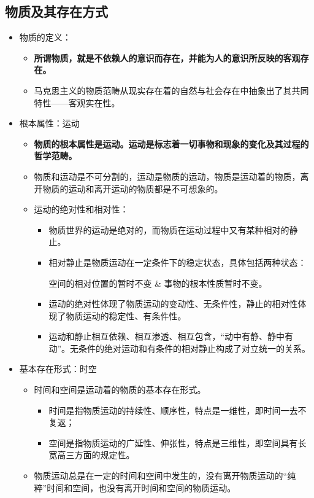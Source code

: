 \documentclass[12pt,openany]{ctexbook}
\begin{document}
\subsection{物质及其存在方式}
\begin{itemize}
  \item 物质的定义：
\begin{itemize}
  \item \textbf{所谓物质，就是不依赖人的意识而存在，并能为人的意识所反映的客观存在。}
  \item 马克思主义的物质范畴从现实存在着的自然与社会存在中抽象出了其共同特性——客观实在性。
\end{itemize}
  \item 根本属性：运动
\begin{itemize}
  \item \textbf{物质的根本属性是运动。运动是标志着一切事物和现象的变化及其过程的哲学范畴。}
  \item 物质和运动是不可分割的，运动是物质的运动，物质是运动着的物质，离开物质的运动和离开运动的物质都是不可想象的。
  \item 运动的绝对性和相对性：
\begin{itemize}
  \item 物质世界的运动是绝对的，而物质在运动过程中又有某种相对的静止。
  \item 相对静止是物质运动在一定条件下的稳定状态，具体包括两种状态：
  \par 空间的相对位置的暂时不变 \& 事物的根本性质暂时不变。
  \item 运动的绝对性体现了物质运动的变动性、无条件性，静止的相对性体现了物质运动的稳定性、有条件性。
  \item 运动和静止相互依赖、相互渗透、相互包含，“动中有静、静中有动”。无条件的绝对运动和有条件的相对静止构成了对立统一的关系。
\end{itemize}
\end{itemize}
  \item 基本存在形式：时空
\begin{itemize}
  \item 时间和空间是运动着的物质的基本存在形式。
\begin{itemize}
  \item 时间是指物质运动的持续性、顺序性，特点是一维性，即时间一去不复返；
  \item 空间是指物质运动的广延性、伸张性，特点是三维性，即空间具有长宽高三方面的规定性。
\end{itemize}
  \item 物质运动总是在一定的时间和空间中发生的，没有离开物质运动的“纯粹”时间和空间，也没有离开时间和空间的物质运动。

\end{itemize}
\end{itemize}
\end{document}
